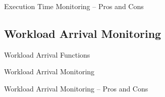\begin{frame}{Execution Time Monitoring -- Pros and Cons}

\end{frame}


\subsection{Workload Arrival Monitoring}

\begin{frame}{Workload Arrival Functions}

\end{frame}

\begin{frame}{Workload Arrival Monitoring}

\end{frame}


\begin{frame}{Workload Arrival Monitoring -- Pros and Cons}

\end{frame}

